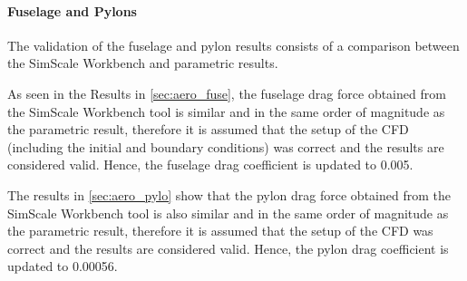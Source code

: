 \paragraph{Fuselage and Pylons} The validation of the fuselage and pylon results consists of a comparison between the SimScale Workbench and parametric results. 

As seen in the Results in \autoref{sec:aero_fuse}, the fuselage drag force obtained from the SimScale Workbench tool is similar and in the same order of magnitude as the parametric result, therefore it is assumed that the setup of the CFD (including the initial and boundary conditions) was correct and the results are considered valid. Hence, the fuselage drag coefficient is updated to 0.005.

The results in \autoref{sec:aero_pylo} show that the pylon drag force obtained from the SimScale Workbench tool is also similar and in the same order of magnitude as the parametric result, therefore it is assumed that the setup of the CFD was correct and the results are considered valid. Hence, the pylon drag coefficient is updated to 0.00056.
